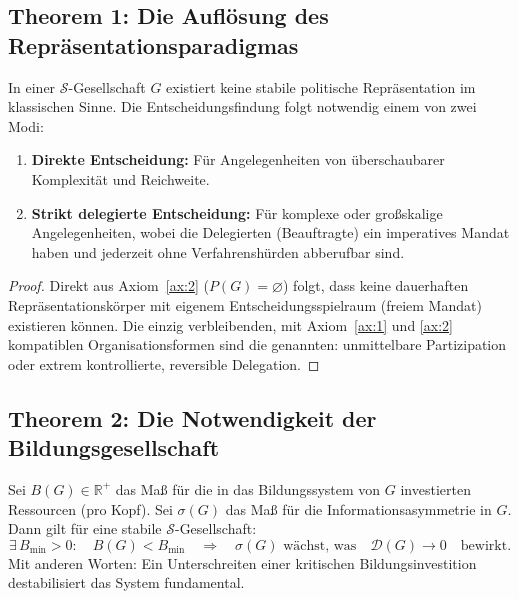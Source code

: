 \subsection{Theorem 1: Die Auflösung des Repräsentationsparadigmas}

\begin{theorem}
    In einer $\mathcal{S}$-Gesellschaft $G$ existiert keine stabile politische Repräsentation im klassischen Sinne. Die Entscheidungsfindung folgt notwendig einem von zwei Modi:
    \begin{enumerate}
        \item \textbf{Direkte Entscheidung:} Für Angelegenheiten von überschaubarer Komplexität und Reichweite.
        \item \textbf{Strikt delegierte Entscheidung:} Für komplexe oder großskalige Angelegenheiten, wobei die Delegierten (\glqq Beauftragte\grqq) ein imperatives Mandat haben und jederzeit ohne Verfahrenshürden abberufbar sind.
    \end{enumerate}
\end{theorem}

\begin{proof}
    Direkt aus Axiom~\ref{ax:2} ($P(G)=\varnothing$) folgt, dass keine dauerhaften Repräsentationskörper mit eigenem Entscheidungsspielraum (freiem Mandat) existieren können. Die einzig verbleibenden, mit Axiom~\ref{ax:1} und \ref{ax:2} kompatiblen Organisationsformen sind die genannten: unmittelbare Partizipation oder extrem kontrollierte, reversible Delegation.
\end{proof}

\subsection{Theorem 2: Die Notwendigkeit der Bildungsgesellschaft}

\begin{theorem}
    Sei $B(G) \in \mathbb{R}^+$ das Maß für die in das Bildungssystem von $G$ investierten Ressourcen (pro Kopf). Sei $\sigma(G)$ das Maß für die Informationsasymmetrie in $G$. Dann gilt für eine stabile $\mathcal{S}$-Gesellschaft:
    \[
    \boxed{\exists\, B_{\min} > 0: \quad B(G) < B_{\min} \quad \Rightarrow \quad \sigma(G) \text{ wächst, was} \quad \mathcal{D}(G) \to 0 \quad \text{bewirkt}.}
    \]
    Mit anderen Worten: Ein Unterschreiten einer kritischen Bildungsinvestition destabilisiert das System fundamental.
\end{theorem}

